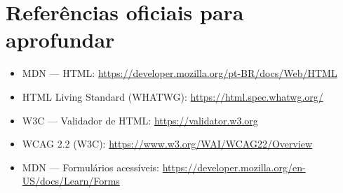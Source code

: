 \section{Referências oficiais para aprofundar}

\begin{itemize}[leftmargin=*, itemsep=0.3em]
  \item MDN — HTML: \url{https://developer.mozilla.org/pt-BR/docs/Web/HTML}
  \item HTML Living Standard (WHATWG): \url{https://html.spec.whatwg.org/}
  \item W3C — Validador de HTML: \url{https://validator.w3.org}
  \item WCAG 2.2 (W3C): \url{https://www.w3.org/WAI/WCAG22/Overview}
  \item MDN — Formulários acessíveis: \url{https://developer.mozilla.org/en-US/docs/Learn/Forms}
\end{itemize}
